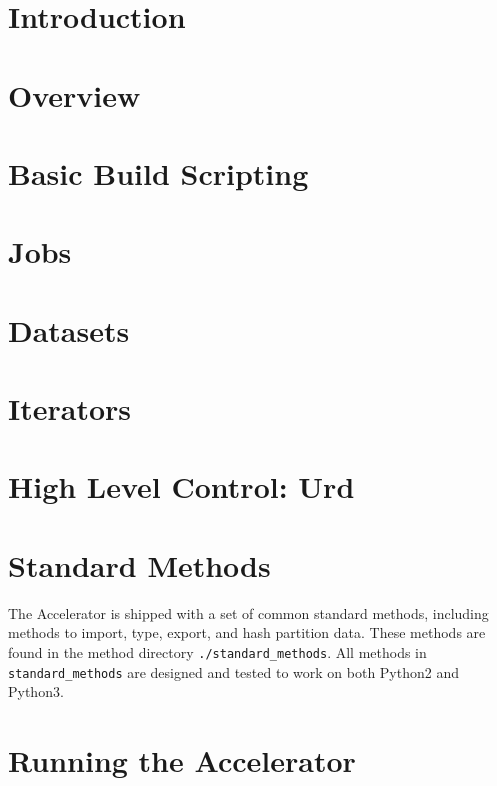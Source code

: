 \documentclass[a4paper]{report}
\begin{document}
\newpage
\tableofcontents

\chapter{Introduction}


\chapter{Overview}


\chapter{Basic Build Scripting}


\chapter{Jobs}


\chapter{Datasets}


\chapter{Iterators}


\chapter{High Level Control:  Urd}


\chapter{Standard Methods}
The Accelerator is shipped with a set of common standard methods,
including methods to import, type, export, and hash partition data.
These methods are found in the method
directory \texttt{./standard\_methods}.  All methods
in \texttt{standard\_methods} are designed and tested to work on both
Python2 and Python3.



\chapter{Running the Accelerator}



\appendix
\end{document}
